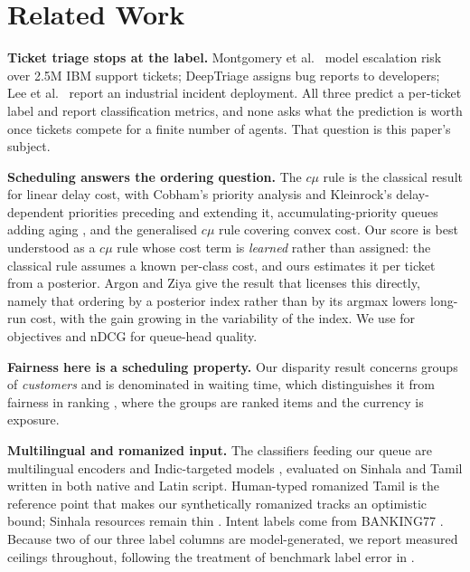 \section{Related Work}
\label{sec:related}

\textbf{Ticket triage stops at the label.} Montgomery et al.\
\cite{montgomery2018escalation} model escalation risk over 2.5M IBM support
tickets; DeepTriage \cite{mani2019deeptriage} assigns bug reports to developers;
Lee et al.\ \cite{lee2017industrialtriage} report an industrial incident
deployment. All three predict a per-ticket label and report classification
metrics, and none asks what the prediction is worth once tickets compete for a
finite number of agents. That question is this paper's subject.

\textbf{Scheduling answers the ordering question.} The $c\mu$ rule
\cite{cox1961queues} is the classical result for linear delay cost, with
Cobham's priority analysis \cite{cobham1954priority} and Kleinrock's
delay-dependent priorities \cite{kleinrock1964delay} preceding and extending it,
accumulating-priority queues adding aging \cite{stanford2014accumulating}, and
the generalised $c\mu$ rule \cite{vanmieghem1995generalized} covering convex
cost. Our score is best understood as a $c\mu$ rule whose cost term is
\emph{learned} rather than assigned: the classical rule assumes a known per-class
cost, and ours estimates it per ticket from a posterior. Argon and Ziya
\cite{argon2009priority} give the result that licenses this directly, namely that
ordering by a posterior index rather than by its argmax lowers long-run cost,
with the gain growing in the variability of the index. We use
\cite{pinedo2022scheduling} for objectives and nDCG \cite{jarvelin2002ndcg} for
queue-head quality.

\textbf{Fairness here is a scheduling property.} Our disparity result concerns
groups of \emph{customers} and is denominated in waiting time, which
distinguishes it from fairness in ranking \cite{singh2018fairexposure}, where
the groups are ranked items and the currency is exposure.

\textbf{Multilingual and romanized input.} The classifiers feeding our queue are
multilingual encoders \cite{conneau2020xlmr,feng2022labse,marone2025mmbert} and
Indic-targeted models \cite{khanuja2021muril}, evaluated on Sinhala and Tamil
written in both native and Latin script. Human-typed romanized Tamil
\cite{chakravarthi2020tamilmix} is the reference point that makes our
synthetically romanized tracks an optimistic bound; Sinhala resources remain
thin \cite{desilva2019sinhalasurvey,sumanathilaka2026swabhasha}. Intent labels
come from BANKING77 \cite{casanueva2020banking77}. Because two of our three label
columns are model-generated, we report measured ceilings throughout, following
the treatment of benchmark label error in \cite{northcutt2021labelerrors}.
